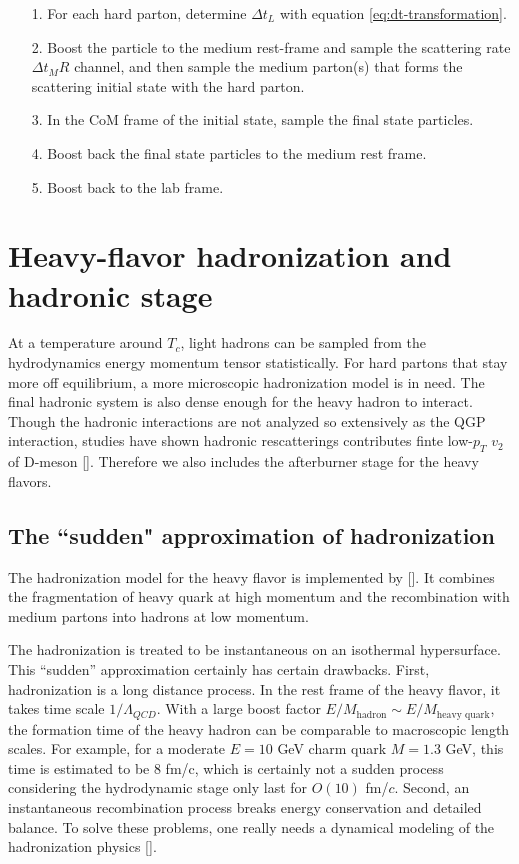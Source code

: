 \begin{itemize}
\item[1.] For each hard parton, determine $\Delta t_L$ with equation \ref{eq:dt-transformation}.
\item[2.] Boost the particle to the medium rest-frame and sample the scattering rate $\Delta t_M R$ channel, and then sample the medium parton(s) that forms the scattering initial state with the hard parton.
\item[3.] In the CoM frame of the initial state, sample the final state particles.
\item[4.] Boost back the final state particles to the medium rest frame.
\item[5.] Boost back to the lab frame.
\end{itemize}

\section{Heavy-flavor hadronization and hadronic stage}
\label{section:hadronization}
At a temperature around $T_c$, light hadrons can be sampled from the hydrodynamics energy momentum tensor statistically.
For hard partons that stay more off equilibrium, a more microscopic hadronization model is in need.
The final hadronic system is also dense enough for the heavy hadron to interact.
Though the hadronic interactions are not analyzed so extensively as the QGP interaction, studies have shown hadronic rescatterings contributes finte low-$p_T$ $v_2$ of D-meson [].
Therefore we also includes the afterburner stage for the heavy flavors.

\subsection{The ``sudden" approximation of hadronization} 
The hadronization model for the heavy flavor is implemented by [].
It combines the fragmentation of heavy quark at high momentum and the recombination with medium partons into hadrons at low momentum.

The hadronization is treated to be instantaneous on an isothermal hypersurface.
This ``sudden'' approximation certainly has certain drawbacks.
First, hadronization is a long distance process. 
In the rest frame of the heavy flavor, it takes time scale $1/\Lambda_{QCD}$. 
With a large boost factor $E/M_{\textrm{hadron}}\sim E/M_{\textrm{heavy quark}}$, the formation time of the heavy hadron can be comparable to macroscopic length scales.
For example, for a moderate $E=10$ GeV charm quark $M=1.3$ GeV, this time is estimated to be $8$ fm/c, which is certainly not a sudden process considering the hydrodynamic stage only last for $O(10)$ fm/$c$.
Second, an instantaneous recombination process breaks energy conservation and detailed balance.
To solve these problems, one really needs a dynamical modeling of the hadronization physics [].

